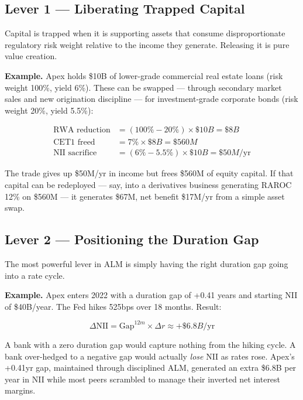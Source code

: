 \documentclass[12pt,a4paper]{article}
\begin{document}
\subsection{Lever 1 --- Liberating Trapped Capital}

Capital is trapped when it is supporting assets that consume disproportionate
regulatory risk weight relative to the income they generate.  Releasing it is
pure value creation.

\textbf{Example.}  Apex holds \$10B of lower-grade commercial real estate
loans (risk weight 100\%, yield 6\%).  These can be swapped --- through
secondary market sales and new origination discipline --- for investment-grade
corporate bonds (risk weight 20\%, yield 5.5\%):

\begin{align}
  \text{RWA reduction} &= (100\% - 20\%) \times \$10B = \$8B \\
  \text{CET1 freed} &= 7\% \times \$8B = \$560M \\
  \text{NII sacrifice} &= (6\% - 5.5\%) \times \$10B = \$50M/\text{yr}
\end{align}

The trade gives up \$50M/yr in income but frees \$560M of equity capital.
If that capital can be redeployed --- say, into a derivatives business
generating RAROC 12\% on \$560M --- it generates \$67M, net benefit \$17M/yr
from a simple asset swap.

\subsection{Lever 2 --- Positioning the Duration Gap}

The most powerful lever in ALM is simply having the right duration gap
going into a rate cycle.

\textbf{Example.}  Apex enters 2022 with a duration gap of +0.41 years and
starting NII of \$40B/year.  The Fed hikes 525bps over 18 months.  Result:

\begin{equation}
  \Delta\text{NII} = \text{Gap}^{12m} \times \Delta r \approx +\$6.8B/\text{yr}
\end{equation}

\begin{mdframed}[style=plainenglish]
A bank with a zero duration gap would capture nothing from the hiking cycle.
A bank over-hedged to a negative gap would actually \emph{lose} NII as rates
rose.  Apex's +0.41yr gap, maintained through disciplined ALM, generated
an extra \$6.8B per year in NII while most peers scrambled to manage their
inverted net interest margins.
\end{mdframed}
\end{document}
